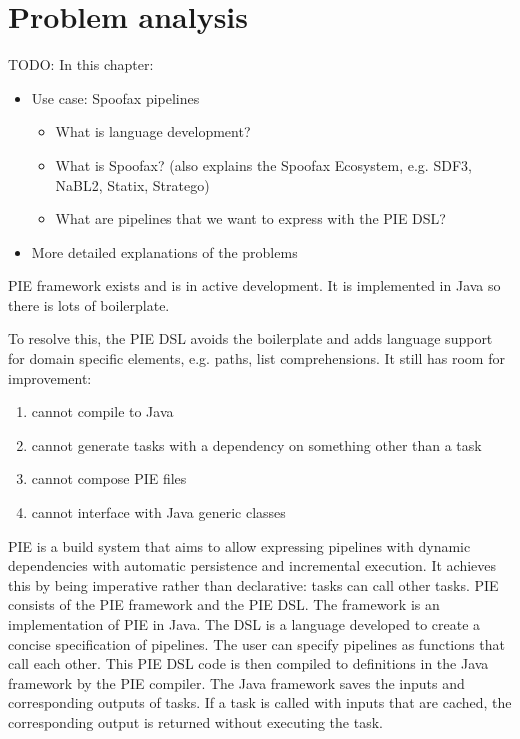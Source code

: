 
\section{Problem analysis}
\label{sec:problem_analysis}

TODO: In this chapter:
\begin{itemize}
  \item Use case: Spoofax pipelines
  \begin{itemize}
    \item What is language development?
    \item What is Spoofax? (also explains the Spoofax Ecosystem, e.g. SDF3, NaBL2, Statix, Stratego)
    \item What are pipelines that we want to express with the PIE DSL?
  \end{itemize}
  \item More detailed explanations of the problems
\end{itemize}

PIE framework exists and is in active development.
It is implemented in Java so there is lots of boilerplate.

To resolve this, the PIE DSL avoids the boilerplate and adds language support for domain specific elements, e.g. paths, list comprehensions.
It still has room for improvement:
\begin{enumerate}
  \item cannot compile to Java
  \item cannot generate tasks with a dependency on something other than a task
  \item cannot compose PIE files
  \item cannot interface with Java generic classes
\end{enumerate}


\Ac{PIE} is a build system that aims to allow expressing pipelines with dynamic dependencies with automatic persistence and incremental execution.
It achieves this by being imperative rather than declarative: tasks can call other tasks.
\Ac{PIE} consists of the PIE framework and the \ac{PIE} \ac{DSL}.
The framework is an implementation of \ac{PIE} in Java.
The \ac{DSL} is a language developed to create a concise specification of pipelines.
The user can specify pipelines as functions that call each other.
This \ac{PIE} \ac{DSL} code is then compiled to definitions in the Java framework by the \ac{PIE} compiler.
The Java framework saves the inputs and corresponding outputs of tasks.
If a task is called with inputs that are cached, the corresponding output is returned without executing the task.


